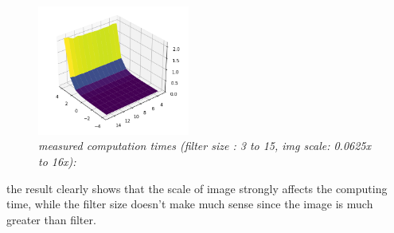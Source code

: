 	\begin{figure}[h!]
	    \centering
	    \includegraphics[width=5cm]{question4_plot.png}
	    \caption{\emph{measured computation times (filter size : 3 to 15, img scale: 0.0625x to 16x):}}
	    \label{fig:result5}
	\end{figure}
	the result clearly shows that the scale of image strongly affects the computing time, while the filter size doesn't make much sense since the image is much greater than filter.
	
	\pagebreak
	
	
	
	
